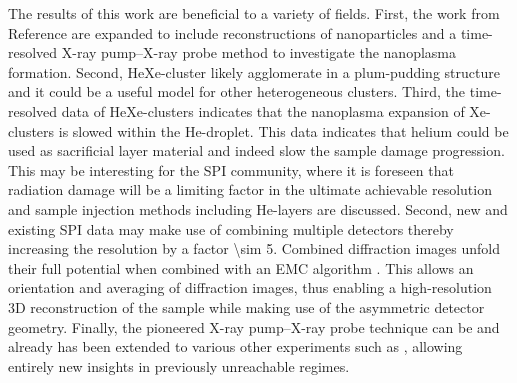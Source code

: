%
The results of this work are beneficial to a variety of fields. First, the work from Reference \citep{Hoener-2008-JPB,Gorkhover-2016-NatPho} are expanded to include reconstructions of nanoparticles and a time-resolved X-ray pump--X-ray probe method to investigate the nanoplasma formation. Second, HeXe-cluster likely agglomerate in a plum-pudding structure and it could be a useful model for other heterogeneous clusters. Third, the time-resolved data of HeXe-clusters indicates that the nanoplasma expansion of Xe-clusters is slowed within the He-droplet. This data indicates that helium could be used as sacrificial layer material and indeed slow the sample damage progression. This may be interesting for the SPI community, where it is foreseen that radiation damage will be a limiting factor in the ultimate achievable resolution \citep{Aquila-2015-StrucDyn} and sample injection methods including He-layers are discussed. Second, new and existing SPI data may make use of combining multiple detectors thereby increasing the resolution by a factor \num{\sim 5}. Combined diffraction images unfold their full potential when combined with an EMC algorithm \citep{Loh-2009-PRE}. This allows an orientation and averaging of diffraction images, thus enabling a high-resolution 3D reconstruction of the sample while making use of the asymmetric detector geometry. Finally, the pioneered X-ray pump--X-ray probe technique can be and already has been extended to various other experiments such as \cite{Lehmann-2016-PRA,Kimberg-2016-FD,Al-Haddad-2017-unpublished,Ferguson-2016-SciAdv,Picon-2016-NatComm}, allowing entirely new insights in previously unreachable regimes.
%
%
%